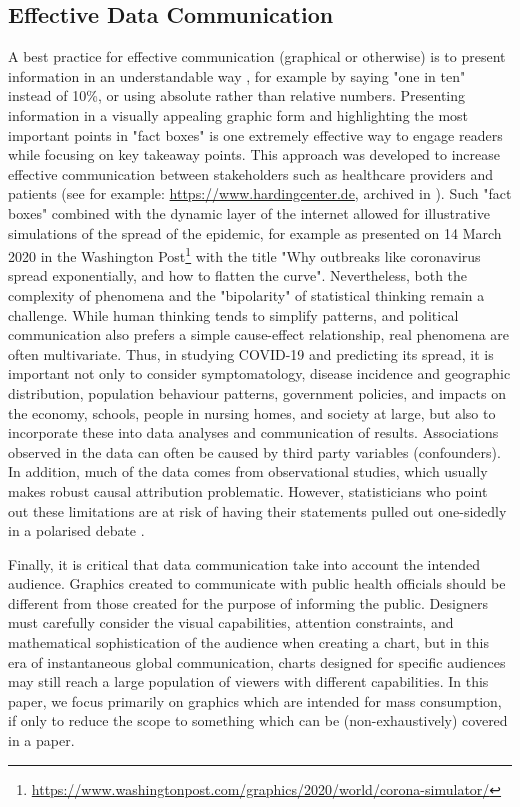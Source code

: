 \documentclass[article]{jdssv}\usepackage[]{graphicx}\usepackage[]{xcolor}
\begin{document}
\subsection{Effective Data Communication}
A best practice for effective communication (graphical or otherwise) is to present information in an understandable way \citep{gigerenzerHelpingDoctorsPatients2007,gigerenzerWhatAreNatural2011}, for example by saying "one in ten" instead of 10\%, or using absolute rather than relative numbers. 
Presenting information in a visually appealing graphic form and highlighting the most important points in "fact boxes" is one extremely effective way to engage readers while focusing on key takeaway points. 
This approach was developed to increase effective communication between stakeholders such as healthcare providers and patients (see for example: \url{https://www.hardingcenter.de}, archived in ). 
Such "fact boxes" combined with the dynamic layer of the internet allowed for illustrative simulations of the spread of the epidemic, for example as presented on 14 March 2020 in the Washington Post\footnote{\url{https://www.washingtonpost.com/graphics/2020/world/corona-simulator/}} with the title "Why outbreaks like coronavirus spread exponentially, and how to flatten the curve".  Nevertheless, both the complexity of phenomena and the "bipolarity" of statistical thinking remain a challenge. 
While human thinking tends to simplify patterns, and political communication also prefers a simple cause-effect relationship, real phenomena are often multivariate. 
Thus, in studying COVID-19 and predicting its spread, it is important not only to consider symptomatology, disease incidence and geographic distribution, population behaviour patterns, government policies, and impacts on the economy, schools, people in nursing homes, and society at large, but also to incorporate these into data analyses and communication of results. 
Associations observed in the data can often be caused by third party variables (confounders). 
In addition, much of the data comes from observational studies, which usually makes robust causal attribution problematic. 
However, statisticians who point out these limitations are at risk of having their statements pulled out one-sidedly in a polarised debate \citep{McConway2021}.

Finally, it is critical that data communication take into account the intended audience. Graphics created to communicate with public health officials should be different from those created for the purpose of informing the public. Designers must carefully consider the visual capabilities, attention constraints, and mathematical sophistication of the audience when creating a chart, but in this era of instantaneous global communication, charts designed for specific audiences may still reach a large population of viewers with different capabilities. In this paper, we focus primarily on graphics which are intended for mass consumption, if only to reduce the scope to something which can be (non-exhaustively) covered in a paper.
\end{document}
